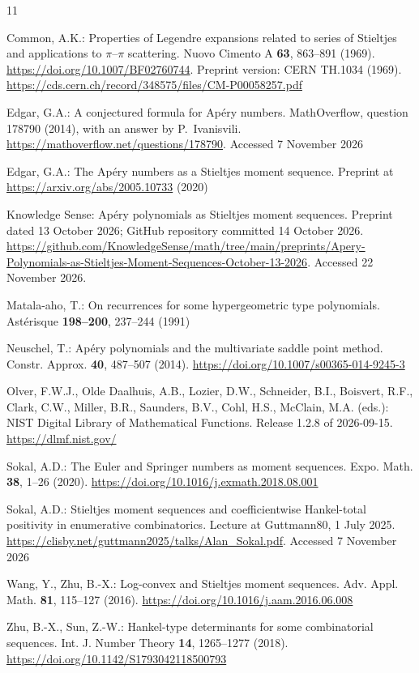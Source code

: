 \documentclass[11pt]{article}
\begin{document}
\begin{thebibliography}{11}
\providecommand{\doi}[1]{\url{https://doi.org/#1}}

Common, A.K.: Properties of Legendre expansions related to series of
Stieltjes and applications to $\pi$--$\pi$ scattering. Nuovo Cimento A
\textbf{63}, 863--891 (1969). \doi{10.1007/BF02760744}. Preprint
version: CERN TH.1034 (1969).
\url{https://cds.cern.ch/record/348575/files/CM-P00058257.pdf}

Edgar, G.A.: A conjectured formula for Ap\'ery numbers. MathOverflow,
question 178790 (2014), with an answer by P.~Ivanisvili.
\url{https://mathoverflow.net/questions/178790}. Accessed 7 November 2026

Edgar, G.A.: The Ap\'ery numbers as a Stieltjes moment sequence.
Preprint at \url{https://arxiv.org/abs/2005.10733} (2020)

Knowledge Sense: Ap\'ery polynomials as Stieltjes moment sequences.
Preprint dated 13 October 2026; GitHub repository committed
14 October 2026.
\url{https://github.com/KnowledgeSense/math/tree/main/preprints/Apery-Polynomials-as-Stieltjes-Moment-Sequences-October-13-2026}.
Accessed 22 November 2026.

Matala-aho, T.: On recurrences for some hypergeometric type polynomials.
Ast\'erisque \textbf{198--200}, 237--244 (1991)

Neuschel, T.: Ap\'ery polynomials and the multivariate saddle point
method. Constr. Approx. \textbf{40}, 487--507 (2014).
\doi{10.1007/s00365-014-9245-3}

Olver, F.W.J., Olde Daalhuis, A.B., Lozier, D.W., Schneider, B.I.,
Boisvert, R.F., Clark, C.W., Miller, B.R., Saunders, B.V., Cohl, H.S.,
McClain, M.A. (eds.): NIST Digital Library of Mathematical Functions.
Release 1.2.8 of 2026-09-15. \url{https://dlmf.nist.gov/}

Sokal, A.D.: The Euler and Springer numbers as moment sequences. Expo.
Math. \textbf{38}, 1--26 (2020). \doi{10.1016/j.exmath.2018.08.001}

Sokal, A.D.: Stieltjes moment sequences and coefficientwise Hankel-total
positivity in enumerative combinatorics. Lecture at Guttmann80, 1 July
2025. \url{https://clisby.net/guttmann2025/talks/Alan_Sokal.pdf}.
Accessed 7 November 2026

Wang, Y., Zhu, B.-X.: Log-convex and Stieltjes moment sequences. Adv.
Appl. Math. \textbf{81}, 115--127 (2016). \doi{10.1016/j.aam.2016.06.008}

Zhu, B.-X., Sun, Z.-W.: Hankel-type determinants for some combinatorial
sequences. Int. J. Number Theory \textbf{14}, 1265--1277 (2018).
\doi{10.1142/S1793042118500793}

\end{thebibliography}
\end{document}
